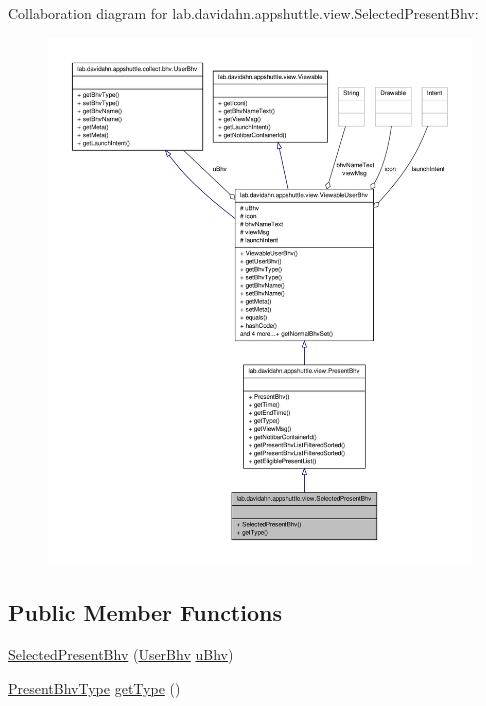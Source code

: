 \-Collaboration diagram for lab.\-davidahn.\-appshuttle.\-view.\-Selected\-Present\-Bhv\-:
\nopagebreak
\begin{figure}[H]
\begin{center}
\leavevmode
\includegraphics[width=350pt]{classlab_1_1davidahn_1_1appshuttle_1_1view_1_1_selected_present_bhv__coll__graph}
\end{center}
\end{figure}
\subsection*{\-Public \-Member \-Functions}
\begin{DoxyCompactItemize}
\item 
\hyperlink{classlab_1_1davidahn_1_1appshuttle_1_1view_1_1_selected_present_bhv_a0e17a447bf8b63d278338667d8886ebc}{\-Selected\-Present\-Bhv} (\hyperlink{interfacelab_1_1davidahn_1_1appshuttle_1_1collect_1_1bhv_1_1_user_bhv}{\-User\-Bhv} \hyperlink{classlab_1_1davidahn_1_1appshuttle_1_1view_1_1_viewable_user_bhv_a562684126a3e756e8ebe246c89699ba9}{u\-Bhv})
\item 
\hyperlink{enumlab_1_1davidahn_1_1appshuttle_1_1view_1_1_present_bhv_type}{\-Present\-Bhv\-Type} \hyperlink{classlab_1_1davidahn_1_1appshuttle_1_1view_1_1_selected_present_bhv_a8481c2cdc527a5c7cce1d4c0b9bfbbc4}{get\-Type} ()
\end{DoxyCompactItemize}



